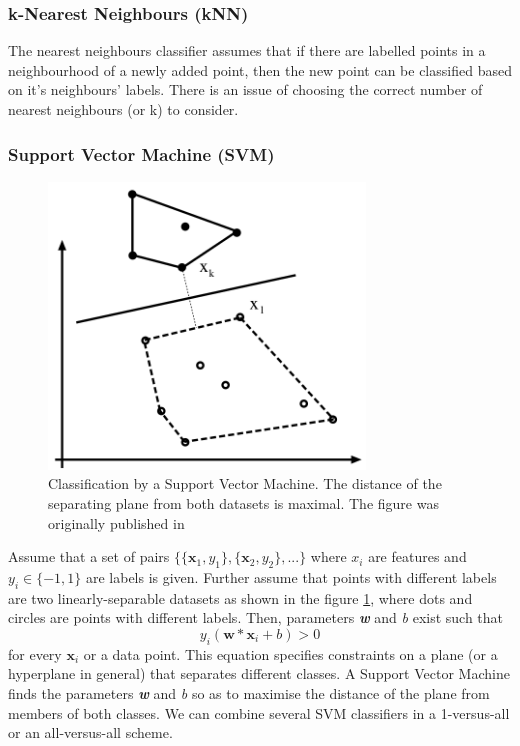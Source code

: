 \documentclass[11pt,twoside]{article}
\begin{document}
    \subsubsection{k-Nearest Neighbours (kNN)}
    The nearest neighbours classifier assumes that if there are labelled points in a neighbourhood of a newly added point, then the new point can be classified based on it's neighbours' labels. There is an issue of choosing the correct number of nearest neighbours (or k) to consider.	
    
    \subsubsection{Support Vector Machine (SVM)}
    \begin{figure}[!ht]
    \centering
    \includegraphics[width=0.75\textwidth]{../figs/svm}
    \caption{Classification by a Support Vector Machine. The distance of the separating plane from both datasets is maximal. The figure was originally published in \cite{ponce2011cv}}
    \label{fig:svm}
    \end{figure}
    
    Assume that a set of pairs $\{\{\mathbf{x}_1, y_1\}, \{\mathbf{x}_2, y_2\}, ...\}$ where $x_\mathit{i}$ are features and $y_\mathit{i} \in \{-1, 1\}$ are labels is given. Further assume that points with different labels are two linearly-separable datasets as shown in the figure \ref{fig:svm}, where dots and circles are points with different labels. Then, parameters \textbf{\textit{w}} and  \textit{b} exist such that	
    \begin{equation}	                        y_\mathit{i}\left(\mathbf{w}*\mathbf{x}_\mathit{i} + b\right) > 0
    \end{equation}
    for every $\mathbf{x}_\mathit{i}$ or a data point. This equation specifies constraints on a plane (or a hyperplane in general) that separates different classes. A Support Vector Machine finds the parameters \textbf{\textit{w}} and  \textit{b} so as to maximise the distance of the plane from members of both classes. We can combine several SVM classifiers in a 1-versus-all or an all-versus-all scheme.
\end{document}
